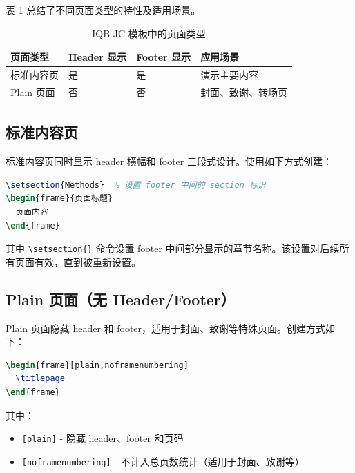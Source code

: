 表 \ref{tab:frame-types} 总结了不同页面类型的特性及适用场景。

\begin{table}[!h]
\centering
\caption{IQB-JC 模板中的页面类型}
\label{tab:frame-types}
\begin{tabular}{p{2.5cm}p{2.5cm}p{2.5cm}p{4cm}}
\toprule
\textbf{页面类型} & \textbf{Header 显示} & \textbf{Footer 显示} & \textbf{应用场景} \\
\midrule
标准内容页 & 是 & 是 & 演示主要内容 \\
Plain 页面 & 否 & 否 & 封面、致谢、转场页 \\
\bottomrule
\end{tabular}
\end{table}

\subsection{标准内容页}

标准内容页同时显示 header 横幅和 footer 三段式设计。使用如下方式创建：

\begin{lstlisting}[style=blockstyle,language=TeX]
\setsection{Methods}  % 设置 footer 中间的 section 标识
\begin{frame}{页面标题}
  页面内容
\end{frame}
\end{lstlisting}

其中 \lstinline|\setsection{}| 命令设置 footer 中间部分显示的章节名称。该设置对后续所有页面有效，直到被重新设置。

\subsection{Plain 页面（无 Header/Footer）}

Plain 页面隐藏 header 和 footer，适用于封面、致谢等特殊页面。创建方式如下：

\begin{lstlisting}[style=blockstyle,language=TeX]
\begin{frame}[plain,noframenumbering]
  \titlepage
\end{frame}
\end{lstlisting}

其中：

\begin{itemize}
    \item \lstinline|[plain]| - 隐藏 header、footer 和页码
    \item \lstinline|[noframenumbering]| - 不计入总页数统计（适用于封面、致谢等）
\end{itemize}

